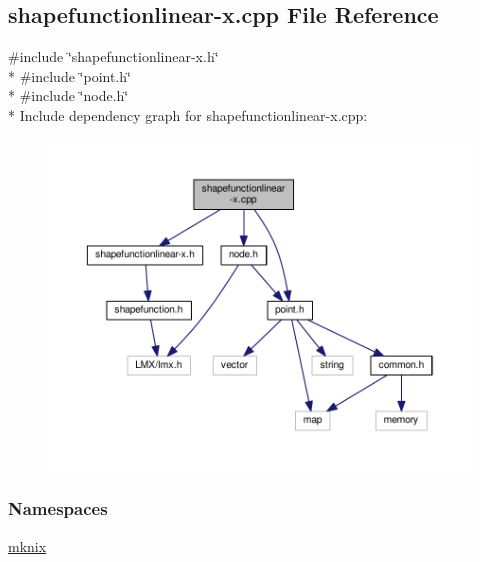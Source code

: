 \hypertarget{shapefunctionlinear-x_8cpp}{}\subsection{shapefunctionlinear-\/x.cpp File Reference}
\label{shapefunctionlinear-x_8cpp}
{\ttfamily \#include \char`\"{}shapefunctionlinear-\/x.\+h\char`\"{}}\\*
{\ttfamily \#include \char`\"{}point.\+h\char`\"{}}\\*
{\ttfamily \#include \char`\"{}node.\+h\char`\"{}}\\*
Include dependency graph for shapefunctionlinear-\/x.cpp\+:\nopagebreak
\begin{figure}[H]
\begin{center}
\leavevmode
\includegraphics[width=350pt]{df/dd2/shapefunctionlinear-x_8cpp__incl}
\end{center}
\end{figure}
\subsubsection*{Namespaces}
\begin{DoxyCompactItemize}
\item 
 \hyperlink{namespacemknix}{mknix}
\end{DoxyCompactItemize}
